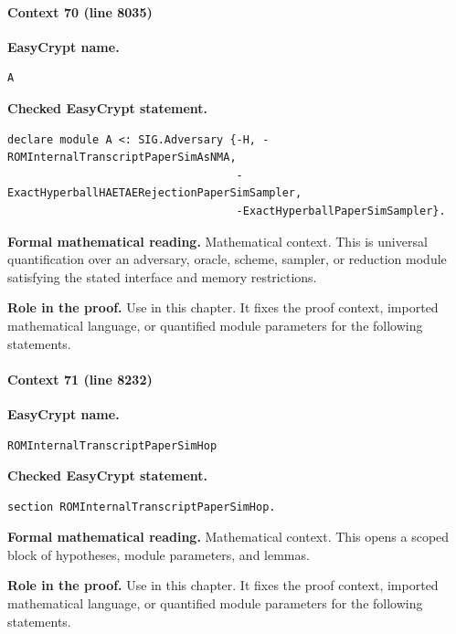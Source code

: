 \paragraph{Context 70 (line 8035)}
\noindent\textbf{EasyCrypt name.}
\begin{lstlisting}[language=EasyCrypt,basicstyle=\ttfamily\scriptsize]
A
\end{lstlisting}
\noindent\textbf{Checked EasyCrypt statement.}
\begin{lstlisting}[language=EasyCrypt,basicstyle=\ttfamily\scriptsize]
declare module A <: SIG.Adversary {-H, -ROMInternalTranscriptPaperSimAsNMA,
                                   -ExactHyperballHAETAERejectionPaperSimSampler,
                                   -ExactHyperballPaperSimSampler}.
\end{lstlisting}
\noindent\textbf{Formal mathematical reading.}
Mathematical context. This is universal quantification over an adversary, oracle, scheme, sampler, or reduction module satisfying the stated interface and memory restrictions.

\noindent\textbf{Role in the proof.}
Use in this chapter. It fixes the proof context, imported mathematical language, or quantified module parameters for the following statements.

\paragraph{Context 71 (line 8232)}
\noindent\textbf{EasyCrypt name.}
\begin{lstlisting}[language=EasyCrypt,basicstyle=\ttfamily\scriptsize]
ROMInternalTranscriptPaperSimHop
\end{lstlisting}
\noindent\textbf{Checked EasyCrypt statement.}
\begin{lstlisting}[language=EasyCrypt,basicstyle=\ttfamily\scriptsize]
section ROMInternalTranscriptPaperSimHop.
\end{lstlisting}
\noindent\textbf{Formal mathematical reading.}
Mathematical context. This opens a scoped block of hypotheses, module parameters, and lemmas.

\noindent\textbf{Role in the proof.}
Use in this chapter. It fixes the proof context, imported mathematical language, or quantified module parameters for the following statements.

